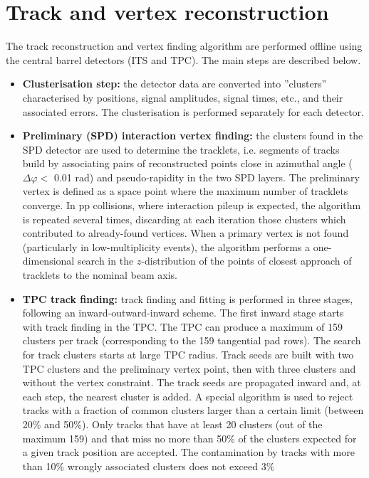 \section{Track and vertex reconstruction}
\label{sec:tracking}
The track reconstruction and vertex finding algorithm are performed offline using the central
barrel detectors (ITS and TPC). The main steps are described below.
\begin{itemize}
\item {\bf Clusterisation step:} the detector data are converted into ''clusters'' characterised 
by positions, signal amplitudes, signal times, etc., and their associated errors. The clusterisation 
is performed separately for each detector. 
\item {\bf Preliminary (SPD) interaction vertex finding:} the clusters found in the SPD detector are used to determine the tracklets,
i.e. segments of tracks build by associating pairs of reconstructed points close in azimuthal angle ($\Delta \varphi <$ 0.01 rad) and 
pseudo-rapidity in the two SPD layers.
The preliminary vertex is defined as a space point where the maximum number of tracklets converge.
In pp collisions, where interaction pileup is expected, the algorithm is repeated several times, discarding at 
each iteration those clusters which contributed to already-found vertices. When a primary vertex is not found 
(particularly in low-multiplicity events), the algorithm performs a one-dimensional 
search in the $z$-distribution of the points of closest approach of tracklets to the nominal beam axis.
\item {\bf TPC track finding:} track finding and fitting is performed in three stages, following an inward-outward-inward scheme.
The first inward stage starts with track finding in the TPC. The TPC can produce a maximum of 159 clusters per track
(corresponding to the 159 tangential pad rows). The search for track clusters starts at large TPC radius.
Track seeds are built with two TPC clusters and the preliminary vertex point, then with three clusters 
and without the vertex constraint. The track seeds are propagated inward and, at each step, 
the nearest cluster is added. A special algorithm is used to reject tracks with a fraction of common clusters
larger than a certain limit (between 20\% and 50\%). Only tracks that have at least 20 clusters (out of the maximum 159)
and that miss no more than 50\% of the clusters expected for a given track position are accepted. 
The contamination by tracks with more than 10\% wrongly associated clusters does not exceed 3\%

\end{itemize}
